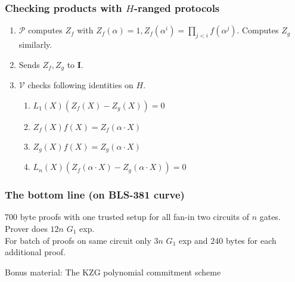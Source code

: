 \documentclass[shadesubsections,trans,14pt,mathserif]{beamer}
\newcommand{\ver}{\ensuremath{\mathcal{V}}}
\newcommand{\prv}{\ensuremath{\mathcal{P}}}
\newcommand{\ideal}{\mathbf{I}}
\newcommand{\gen}{\alpha}
\begin{document}
\begin{frame}
\frametitle{Checking products with $H$-ranged protocols}   %
 \begin{enumerate}
  \item $\prv$ computes $Z_f$ with 
  $ Z_f(\gen)=1, Z_f(\gen^i) = \prod_{j<i}  f(\gen^j)$.
  Computes $Z_g$ similarly.
  \item Sends $Z_f,Z_g$ to $\ideal$.
  \item $\ver$ checks following identities on $H$.
  \begin{enumerate}
   \item $L_1(X) (Z_f(X)-Z_g(X)) =0$
   \item $Z_f(X) f(X) = Z_f(\gen\cdot X)$
   \item $Z_g(X) f(X) = Z_g(\gen\cdot X)$
 \item $L_n(X) (Z_f(\gen\cdot X) -Z_g(\gen\cdot X))=0$ 
 \end{enumerate}

 \end{enumerate}


\end{frame}




\begin{frame}
\frametitle{The bottom line {\normalsize{(on BLS-381 curve)}}}   %
  700 byte proofs with one trusted setup for all fan-in two circuits of $n$ gates.\\
  \vspace{0.2in}
Prover does $12n$ $G_1$ exp.\\
  \vspace{0.2in}
For batch of proofs on same circuit only $3n$ $G_1$ exp and $240$ bytes for each additional proof.
 

\end{frame}


\begin{frame}
\large{Bonus material: The KZG polynomial commitment scheme
}

\end{frame}
\end{document}
